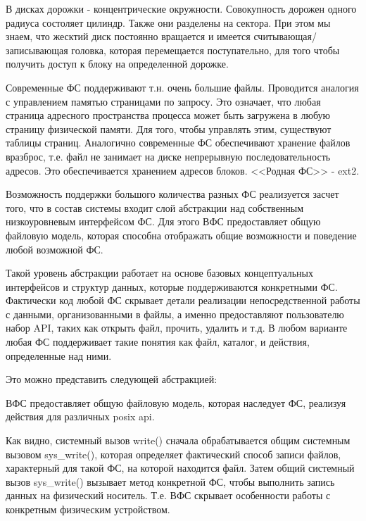 \documentclass[12pt,a4paper]{scrreprt}
\begin{document}
В дисках дорожки - концентрические окружности. Совокупность дорожен одного радиуса состоляет цилиндр. Также они разделены на сектора. При этом мы знаем, что жесктий диск постоянно вращается и имеется считывающая/записывающая головка, которая перемещается поступательно, для того чтобы получить доступ к блоку на определенной дорожке.

Современные ФС поддерживают т.н. очень большие файлы. Проводится аналогия с управлением памятью страницами по запросу. Это означает, что любая страница адресного пространства процесса может быть загружена в любую страницу физической памяти. Для того, чтобы управлять этим, существуют таблицы страниц. Аналогично современные ФС обеспечивают хранение файлов вразброс, т.е. файл не занимает на диске непрерывную последовательность адресов. Это обеспечивается хранением адресов блоков. <<Родная ФС>> - ext2.

Возможность поддержки большого количества разных ФС реализуется засчет того, что в состав системы входит слой абстракции над собственным низкоуровневым интерфейсом ФС. Для этого ВФС предоставляет общую файловую модель, которая способна отображать общие возможности и поведение любой возможной ФС. 

Такой уровень абстракции работает на основе базовых концептуальных интерфейсов и структур данных, которые поддерживаются конкретными ФС. Фактически код любой ФС скрывает детали реализации непосредственной работы с данными, организованными в файлы, а именно предоставляют пользователю набор API, таких как открыть файл, прочить, удалить и т.д. В любом варианте любая ФС поддерживает такие понятия как файл, каталог, и действия, определенные над ними.

Это можно представить следующей абстракцией:

\begin{figure}[!h]
\end{figure}

ВФС предоставляет общую файловую модель, которая наследует ФС, реализуя действия для различных posix api. 

Как видно, системный вызов write() сначала обрабатывается общим системным вызовом sys\_write(), которая	определяет фактический способ записи файлов, характерный для такой ФС, на которой находится файл. Затем общий системный вызов sys\_write() вызывает метод конкретной ФС, чтобы выполнить запись данных на физический носитель. Т.е. ВФС скрывает особенности работы с конкретным физическим устройством.
\end{document}
